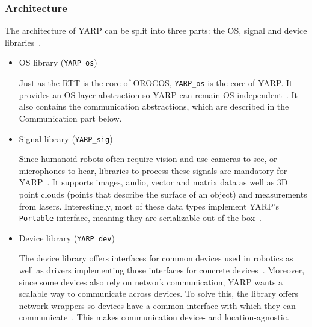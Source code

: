 \documentclass[a4paper]{book}
\begin{document}
\subsubsection{Architecture}
The architecture of YARP can be split into three parts: the OS, signal and
device libraries~\cite{yarp_docs_what}.
\begin{itemize}
    \item OS library (\texttt{YARP\_os})
        \par
        Just as the RTT is the core of OROCOS, \texttt{YARP\_os} is the core of
        YARP. It provides an OS layer abstraction so YARP can remain OS
        independent~\cite{yarp_docs_what}. It also contains the communication
        abstractions, which are described in the Communication part below.
    \item Signal library (\texttt{YARP\_sig})
        \par
        Since humanoid robots often require vision and use cameras to see, or
        microphones to hear, libraries to process these signals are mandatory
        for YARP~\cite{metta2006yarp}. It supports images, audio, vector and
        matrix data as well as 3D point clouds (points that describe the surface
        of an object) and measurements from lasers. Interestingly, most of these
        data types implement YARP's \texttt{Portable} interface, meaning they
        are serializable out of the box~\cite{yarp_repo}.
    \item Device library (\texttt{YARP\_dev})
        \par
        The device library offers interfaces for common devices used in robotics
        as well as drivers implementing those interfaces for concrete
        devices~\cite{yarp_docs_what, yarp_docs_devices}. Moreover, since some
        devices also rely on network communication, YARP wants a scalable way to
        communicate across devices. To solve this, the library offers network
        wrappers so devices have a common interface with which they can
        communicate~\cite{yarp_docs_devices, yarp_docs_nws}. This makes
        communication device- and location-agnostic.
\end{itemize}
\end{document}
